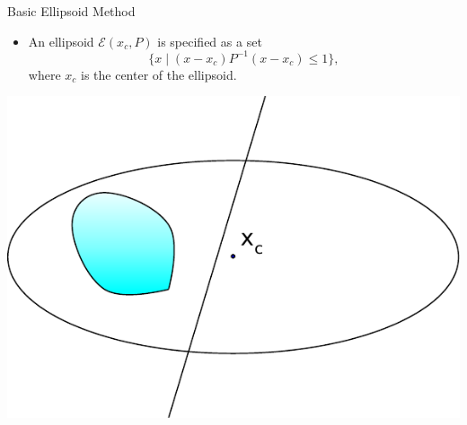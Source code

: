 \documentclass[10pt,ignorenonframetext,serif,onlymath]{beamer}
\providecommand{\tightlist}{%
  \setlength{\itemsep}{0pt}\setlength{\parskip}{0pt}}
\begin{document}
\begin{frame}{Basic Ellipsoid Method}
\protect\hypertarget{sec:basic-ellipsoid-method}{}

\begin{itemize}
\tightlist
\item
  An ellipsoid \(\mathcal{E}(x_c, P)\) is specified as a set
  \[\{x \mid (x-x_c)P^{-1}(x-x_c) \leq 1 \},\] where \(x_c\) is the
  center of the ellipsoid.
\end{itemize}

\includegraphics{ellipsoid.files/ellipsoid.pdf}

\end{frame}
\end{document}
